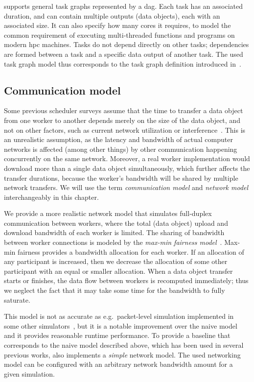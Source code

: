 \estee{} supports general task graphs represented by a \gls{dag}.
Each task has an associated duration, and can contain multiple outputs (data objects), each with an
associated size. It can also specify how many cores it requires, to model the common requirement of
executing multi-threaded functions and programs on modern \gls{hpc} machines. Tasks do not
depend directly on other tasks; dependencies are formed between a task and a specific data
output of another task. The used task graph model thus corresponds to the task graph definition introduced
in~.

\subsection{Communication model}
Some previous scheduler surveys assume that the time to transfer a data object from one worker to
another depends merely on the size of the data object, and not on other factors, such as current
network utilization or interference~\cite{tang2010list,yao2013task,wang2018list,kwok1996dynamic}. This is an unrealistic assumption, as
the latency and bandwidth of actual computer networks is affected (among other things) by other
communication happening concurrently on the same network. Moreover, a real worker implementation
would download more than a single data object simultaneously, which further affects the transfer
durations, because the worker's bandwidth will be shared by multiple network transfers. We will use
the term \emph{communication model} and \emph{network model} interchangeably in this chapter.

We provide a more realistic network model that simulates full-duplex communication between workers,
where the total (data object) upload and download bandwidth of each worker is limited. The sharing
of bandwidth between worker connections is modeled by the
\emph{max-min fairness model}~\cite{bertsekas_1992}. Max-min fairness provides a bandwidth allocation
for each worker. If an allocation of any participant is increased, then we decrease the allocation
of some other participant with an equal or smaller allocation. When a data object transfer starts
or finishes, the data flow between workers is recomputed immediately; thus we neglect the fact that
it may take some time for the bandwidth to fully saturate.

This model is not as accurate as e.g.\ packet-level simulation implemented in some other
simulators~\cite{simgrid}, but it is a notable improvement over the naive model and it
provides reasonable runtime performance. To provide a baseline that corresponds to the naive model
described above, which has been used in several previous works, \estee{} also
implements a \emph{simple} network model. The used networking model can be configured
with an arbitrary network bandwidth amount for a given simulation.

